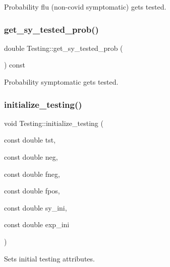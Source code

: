 Probability flu (non-\/covid symptomatic) gets tested. 

\mbox{\label{classTesting_aa8c8052e8179abde17276c0ad78fd247}} 
\subsubsection{\texorpdfstring{get\+\_\+sy\+\_\+tested\+\_\+prob()}{get\_sy\_tested\_prob()}}
{\footnotesize\ttfamily double Testing\+::get\+\_\+sy\+\_\+tested\+\_\+prob (\begin{DoxyParamCaption}{ }\end{DoxyParamCaption}) const\hspace{0.3cm}{\ttfamily [inline]}}



Probability symptomatic gets tested. 

\mbox{\label{classTesting_ad618be281d4c48922f30287d8c8f4379}} 
\subsubsection{\texorpdfstring{initialize\+\_\+testing()}{initialize\_testing()}}
{\footnotesize\ttfamily void Testing\+::initialize\+\_\+testing (\begin{DoxyParamCaption}\item[{const double}]{tst,  }\item[{const double}]{neg,  }\item[{const double}]{fneg,  }\item[{const double}]{fpos,  }\item[{const double}]{sy\+\_\+ini,  }\item[{const double}]{exp\+\_\+ini }\end{DoxyParamCaption})}



Sets initial testing attributes. 


